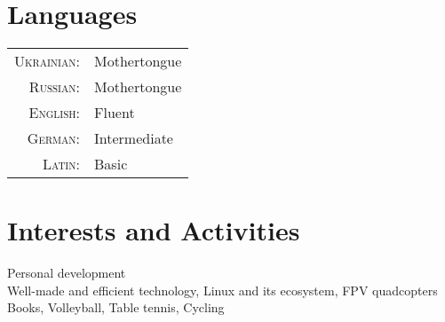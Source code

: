 \documentclass[10pt]{article}
\begin{document}
\section{Languages}
\begin{tabular}{rl}
\textsc{Ukrainian:}&Mothertongue\\
\textsc{Russian:}	 &Mothertongue\\
\textsc{English:}	 &Fluent\\
\textsc{German:}	 &Intermediate\\
\textsc{Latin:}	        &Basic\\
\end{tabular}

\section{Interests and Activities}
Personal development \\
Well-made and efficient technology, Linux and its ecosystem, FPV quadcopters \\
Books, Volleyball, Table tennis, Cycling
\end{document}
